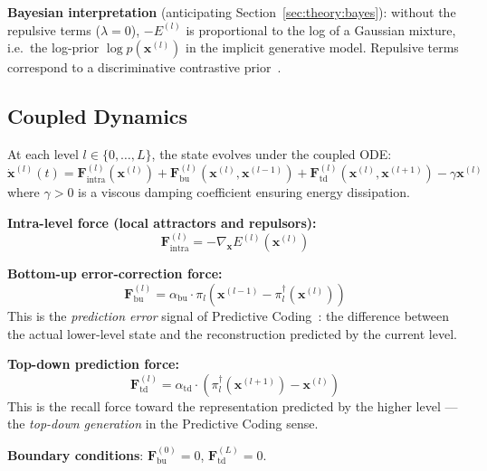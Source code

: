 \documentclass[11pt,a4paper]{article}
\begin{document}
\textbf{Bayesian interpretation} (anticipating Section~\ref{sec:theory:bayes}):
without the repulsive terms ($\lambda=0$), $-E^{(l)}$ is proportional to the log of a
Gaussian mixture, i.e.\ the log-prior $\log p(\mathbf{x}^{(l)})$ in the implicit generative
model. Repulsive terms correspond to a discriminative contrastive
prior~\cite{larochelle2008}.

\subsection{Coupled Dynamics}

At each level $l \in \{0, \ldots, L\}$, the state evolves under the coupled ODE:
\begin{equation}
  \dot{\mathbf{x}}^{(l)}(t) =
  \mathbf{F}^{(l)}_{\mathrm{intra}}(\mathbf{x}^{(l)})
  + \mathbf{F}^{(l)}_{\mathrm{bu}}(\mathbf{x}^{(l)}, \mathbf{x}^{(l-1)})
  + \mathbf{F}^{(l)}_{\mathrm{td}}(\mathbf{x}^{(l)}, \mathbf{x}^{(l+1)})
  - \gamma \mathbf{x}^{(l)}
\label{eq:dynamics}
\end{equation}
where $\gamma > 0$ is a viscous damping coefficient ensuring energy dissipation.

\medskip
\textbf{Intra-level force (local attractors and repulsors):}
\begin{equation}
  \mathbf{F}^{(l)}_{\mathrm{intra}} = -\nabla_{\mathbf{x}} E^{(l)}(\mathbf{x}^{(l)})
\end{equation}

\textbf{Bottom-up error-correction force:}
\begin{equation}
  \mathbf{F}^{(l)}_{\mathrm{bu}} =
  \alpha_{\mathrm{bu}} \cdot \pi_l\!\left(
    \mathbf{x}^{(l-1)} - \pi_l^\dagger(\mathbf{x}^{(l)})
  \right)
\end{equation}
This is the \emph{prediction error} signal of Predictive Coding~\cite{rao1999predictive}:
the difference between the actual lower-level state and the reconstruction predicted by
the current level.

\textbf{Top-down prediction force:}
\begin{equation}
  \mathbf{F}^{(l)}_{\mathrm{td}} =
  \alpha_{\mathrm{td}} \cdot \left(
    \pi_l^\dagger\!\left(\mathbf{x}^{(l+1)}\right) - \mathbf{x}^{(l)}
  \right)
\end{equation}
This is the recall force toward the representation predicted by the higher level --- the
\emph{top-down generation} in the Predictive Coding sense.

\textbf{Boundary conditions}: $\mathbf{F}^{(0)}_{\mathrm{bu}} = 0$,
$\mathbf{F}^{(L)}_{\mathrm{td}} = 0$.
\end{document}
